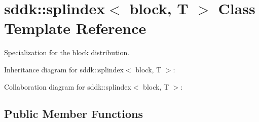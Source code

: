 \hypertarget{classsddk_1_1splindex_3_01block_00_01_t_01_4}{}\section{sddk\+:\+:splindex$<$ block, T $>$ Class Template Reference}
\label{classsddk_1_1splindex_3_01block_00_01_t_01_4}


Specialization for the block distribution.  




Inheritance diagram for sddk\+:\+:splindex$<$ block, T $>$\+:


Collaboration diagram for sddk\+:\+:splindex$<$ block, T $>$\+:
\subsection*{Public Member Functions}

